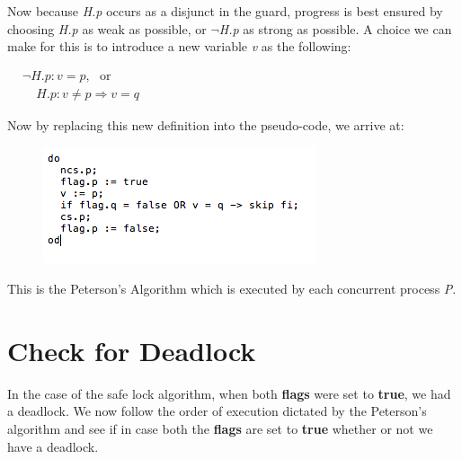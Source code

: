\documentclass[18pt]{extarticle}
\begin{document}
\newpage

Now because \textsl{H.p} occurs as a disjunct in the guard, progress is best ensured by choosing \textsl{H.p} as weak as possible, or $\neg$\textsl{H.p} as strong as possible. A choice we can make for this is to introduce a new variable \textsl{v} as the following: \newline 

$
\begin{matrix}
&\neg H.p: v=p, \ \ \ \text{or} \\
&\ \ \ \ \ H.p: v \neq p \Rightarrow v = q
\end{matrix}
$

Now by replacing this new definition into the pseudo-code, we arrive at:

\begin{figure}[h]
  \includegraphics[scale=0.7]{3}
  \label{fig: version3}
\end{figure}

This is the Peterson's Algorithm which is  executed by each concurrent process \textsl{P}.

\section*{Check for Deadlock}
In the case of the safe lock algorithm, when both \textbf{flags} were set to \textbf{true}, we had a deadlock. \newline \newline
We now follow the order of execution dictated by the Peterson's algorithm and see  if in case both the \textbf{flags} are set to \textbf{true} whether or not we have a deadlock. \newline
\end{document}
